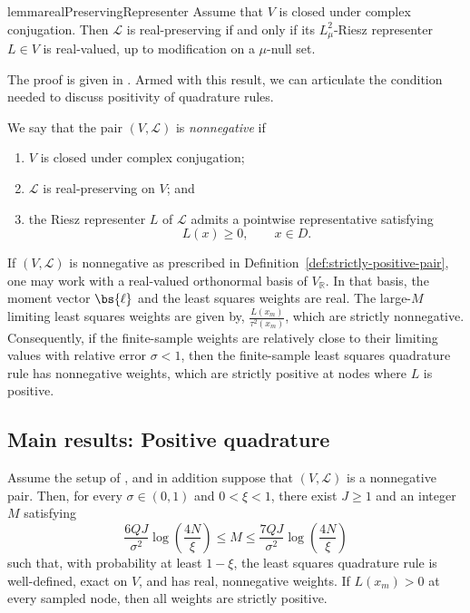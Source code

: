 \documentclass[10pt,dvipsnames]{amsart}
\begin{document}
\begin{restatable}{lemma}{realPreservingRepresenter}
\label{lem:real-preserving-representer}
Assume that \(V\) is closed under complex conjugation.  Then
\(\mathcal L\) is real-preserving if and only if its \(L^2_\mu\)-Riesz
representer \(L\in V\) is real-valued, up to modification on a
\(\mu\)-null set.
\end{restatable}
\noindent The proof is given in . Armed with this result, we can articulate the condition needed to discuss positivity of quadrature rules.
\begin{definition}
\label{def:strictly-positive-pair}
We say that the pair \((V,\mathcal L)\) is \emph{nonnegative} if
\begin{enumerate}
    \item \(V\) is closed under complex conjugation;
    \item \(\mathcal L\) is real-preserving on \(V\); and
    \item the Riesz representer \(L\) of \(\mathcal L\) admits a pointwise
    representative satisfying
    \[
        L(x)\geq 0,
        \qquad x\in D.
    \]
\end{enumerate}
\end{definition}

If $(V,\mathcal{L})$ is nonnegative as prescribed in
Definition~\ref{def:strictly-positive-pair}, one may work with a real-valued
orthonormal basis of \(V_{\mathbb R}\).  In that basis, the moment vector
$\bs{\ell}$ and the least squares weights are real. The large-$M$ limiting
least squares weights are given by, $\frac{L(x_m)}{\tau^2(x_m)}$,
which are strictly nonnegative.  Consequently, if the finite-sample weights
are relatively close to their limiting values with relative error
\(\sigma<1\), then the finite-sample least squares quadrature rule has
nonnegative weights, which are strictly positive at nodes where \(L\) is
positive.



\subsection{Main results: Positive quadrature}
\label{ssec:preliminaries-main}

\begin{theorem}
\label{thm:finite-sample-weight-approximation-positive}
  Assume the setup of , and in addition suppose
  that \((V,\mathcal{L})\) is a nonnegative pair. Then, for every
  \(\sigma\in(0,1)\) and \(0<\xi<1\), there exist \(J\geq1\) and an
  integer \(M\) satisfying
  \[
    \frac{6QJ}{\sigma^2}\log\left(\frac{4N}{\xi}\right)
    \leq M \leq
    \frac{7QJ}{\sigma^2}\log\left(\frac{4N}{\xi}\right)
  \]
  such that, with probability at least \(1-\xi\), the least squares
  quadrature rule is well-defined, exact on \(V\), and has real, nonnegative
  weights. If \(L(x_m)>0\) at every sampled node, then all weights are
  strictly positive.
\end{theorem}
\end{document}
